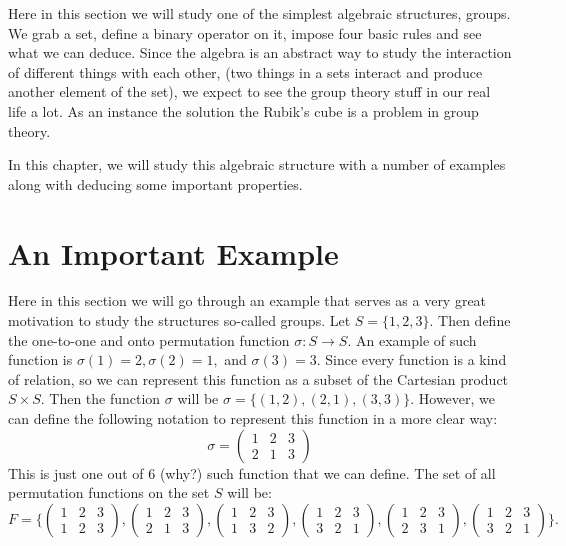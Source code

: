 Here in this section we will study one of the simplest algebraic structures, groups. We grab a set, define a binary operator on it, impose four basic rules and see what we can deduce. Since the algebra is an abstract way to study the interaction of different things with each other, (two things in a sets interact and produce another element of the set), we expect to see the group theory stuff in our real life a lot. As an instance the solution the Rubik's cube is a problem in group theory.

In this chapter, we will study this algebraic structure with a number of examples along with deducing some important properties. 

\section{An Important Example}
Here in this section we will go through an example that serves as a very great motivation to study the structures so-called groups. Let $S = \{1,2,3\}$. Then define the one-to-one and onto permutation function $\sigma: S \rightarrow S$. An example of such function is $\sigma(1) = 2, \sigma(2)=1,$ and $\sigma(3)=3$. Since every function is a kind of relation, so we can represent this function as a subset of the Cartesian product $S \times S$. Then the function $\sigma$ will be $\sigma = \{ (1,2),(2,1),(3,3) \}$. However, we can define the following notation to represent this function in a more clear way:
\[ \sigma = \begin{pmatrix}
	1 & 2 & 3 \\
	2 & 1 & 3
\end{pmatrix} \]
This is just one out of 6 (why?) such function that we can define. The set of all permutation functions on the set $S$ will be:
\[ F = \{ 
	\begin{pmatrix}
	1 & 2 & 3 \\
	1 & 2 & 3
	\end{pmatrix},
	\begin{pmatrix}
		1 & 2 & 3 \\
		2 & 1 & 3
	\end{pmatrix},
	\begin{pmatrix}
		1 & 2 & 3 \\
		1 & 3 & 2
	\end{pmatrix},
	\begin{pmatrix}
		1 & 2 & 3 \\
		3 & 2 & 1
	\end{pmatrix},
	\begin{pmatrix}
		1 & 2 & 3 \\
		2 & 3 & 1
	\end{pmatrix},
	\begin{pmatrix}
		1 & 2 & 3 \\
		3 & 2 & 1
	\end{pmatrix}
	 \}. 
\]

